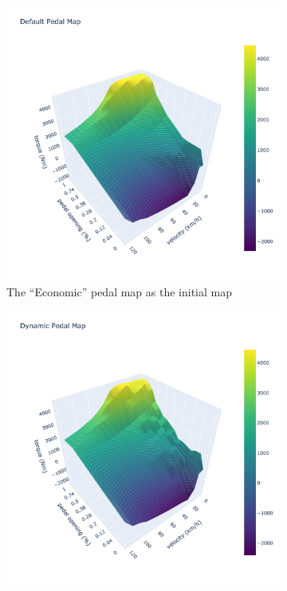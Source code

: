 \documentclass{article}
\begin{document}
\begin{figure}[ht]
	\centering
	\begin{subfigure}[b]{0.45\textwidth}
		\centering
		\includegraphics[width=\textwidth]{images/table_init.png}
		\caption{The ``Economic'' pedal map as the initial map}
		\label{fig:initial pedal map}
	\end{subfigure}
	\hfill
	\begin{subfigure}[b]{0.45\textwidth}
		\centering
		\includegraphics[width=\textwidth]{images/table_final.png}

\end{subfigure}
\end{figure}
\end{document}
